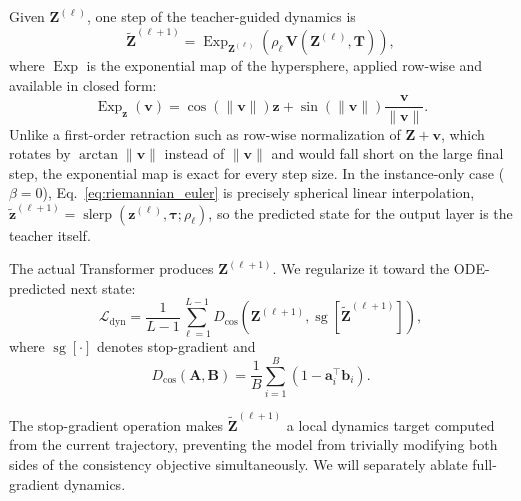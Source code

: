 \documentclass[11pt]{article}
\begin{document}
Given $\mathbf{Z}^{(\ell)}$, one step of the teacher-guided dynamics is
\begin{equation}
    \widetilde{\mathbf{Z}}^{(\ell+1)}
    =
    \operatorname{Exp}_{\mathbf{Z}^{(\ell)}}
    \left(
        \rho_\ell\,
        \mathbf{V}(
            \mathbf{Z}^{(\ell)},
            \mathbf{T}
        )
    \right),
    \label{eq:riemannian_euler}
\end{equation}
where $\operatorname{Exp}$ is the exponential map of the hypersphere,
applied row-wise and available in closed form:
\begin{equation}
    \operatorname{Exp}_{\mathbf{z}}(\mathbf{v})
    =
    \cos\left(\|\mathbf{v}\|\right)\mathbf{z}
    +
    \sin\left(\|\mathbf{v}\|\right)
    \frac{\mathbf{v}}{\|\mathbf{v}\|}.
    \label{eq:retraction}
\end{equation}
Unlike a first-order retraction such as row-wise normalization of
$\mathbf{Z}+\mathbf{v}$, which rotates by $\arctan\|\mathbf{v}\|$
instead of $\|\mathbf{v}\|$ and would fall short on the large final step,
the exponential map is exact for every step size. In the instance-only case
($\beta=0$), Eq.~\eqref{eq:riemannian_euler} is precisely spherical linear
interpolation, $\widetilde{\mathbf{z}}^{(\ell+1)}=\operatorname{slerp}(\mathbf{z}^{(\ell)},\boldsymbol{\tau};\rho_\ell)$,
so the predicted state for the output layer is the teacher itself.

The actual Transformer produces $\mathbf{Z}^{(\ell+1)}$.
We regularize it toward the ODE-predicted next state:
\begin{equation}
    \mathcal{L}_{\mathrm{dyn}}
    =
    \frac{1}{L-1}
    \sum_{\ell=1}^{L-1}
    D_{\cos}
    \left(
        \mathbf{Z}^{(\ell+1)},
        \operatorname{sg}
        \left[
            \widetilde{\mathbf{Z}}^{(\ell+1)}
        \right]
    \right),
    \label{eq:dynamics_loss}
\end{equation}
where $\operatorname{sg}[\cdot]$ denotes stop-gradient and
\begin{equation}
    D_{\cos}(\mathbf{A},\mathbf{B})
    =
    \frac{1}{B}
    \sum_{i=1}^{B}
    \left(
        1-
        \mathbf{a}_i^\top\mathbf{b}_i
    \right).
\end{equation}

The stop-gradient operation makes
$\widetilde{\mathbf{Z}}^{(\ell+1)}$ a local dynamics target computed from
the current trajectory, preventing the model from trivially modifying both
sides of the consistency objective simultaneously. We will separately
ablate full-gradient dynamics.
\end{document}

